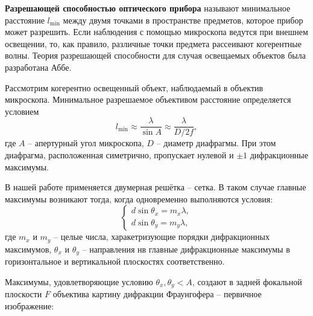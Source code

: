 \documentclass[a4paper, 12pt]{article}%
\begin{document}
\textbf{       }

	\textbf{Разрешающей способностью оптического прибора} называют минимальное расстояние $l_{\text{min}}$ между двумя точками в пространстве предметов, которое прибор может разрешить. Если наблюдения с помощью микроскопа ведутся при внешнем освещении, то, как правило, различные точки предмета рассеивают когерентные волны. Теория разрешающей способности для случая освещаемых объектов была разработана Аббе.

	Рассмотрим когерентно освещенный объект, наблюдаемый в объектив микроскопа. Минимальное разрешаемое объективом расстояние определяется условием
	\begin{equation}
		\label{min}
		l_{\text{min}} \approx \frac{\lambda}{\sin A} \approx \frac{\lambda}{D/2f},
	\end{equation}
	где $A$ -- апертурный угол микроскопа, $D$ -- диаметр диафрагмы. При этом диафрагма, расположенная симетрично, пропускает нулевой и $\pm 1$ дифракционные максимумы.
	
	В нашей работе применяется двумерная решётка -- сетка. В таком случае главные максимумы возникают тогда, когда одновременно выполняются условия:
	\begin{equation}
		\label{system}
		\begin{cases}
			d \sin \theta_x = m_x \lambda, \\
			d \sin \theta_y = m_y \lambda,
		\end{cases}
	\end{equation}
	где $m_x$ и $m_y$ -- целые числа, харакетризующие порядки дифракционных максимумов, $\theta_x$ и $\theta_y$ -- направления нв главные дифракционные максимумы в горизонтальное и вертикальной плоскостях соответственно.
	
	Максимумы, удовлетворяющие условию $\theta_x, \theta_y < A$, создают в задней фокальной плоскости $F$ объектива картину дифракции Фраунгофера  -- первичное изображение:
	
\end{document}
